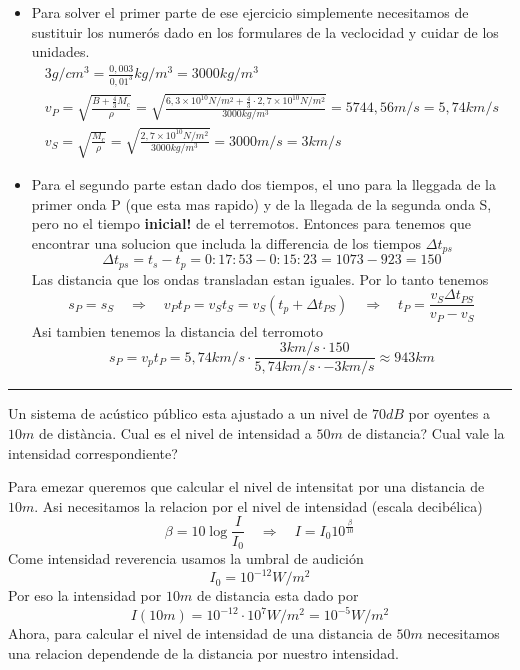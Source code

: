 \begin{itemize}
	\item
	Para solver el primer parte de ese ejercicio simplemente necesitamos de
	sustituir los numerós dado en los formulares de la veclocidad y cuidar de los
	unidades. 
	\begin{align*}
		3 g/cm^3 = \frac{0,003}{0,01^3} kg/m^3 = 3000 kg / m^3 \\
		v_P = \sqrt{\frac{B + \frac{4}{3} M_c}{\rho}} = \sqrt{\frac{6,3\times10^10
	N/m^2 + \frac{4}{3} \cdot 2,7 \times 10^10 N/m^2}{3000 kg/m^3}} = 5744,56 m/s  =
	5,74 km/s \\
		v_S = \sqrt{\frac{M_c}{\rho}} = \sqrt{\frac{2,7\times10^10 N/m^2}{3000
	kg/m^3}} = 3000 m/s = 3 km/s 
	\end{align*}

	\item
	Para el segundo parte estan dado dos tiempos, el uno para la lleggada de la
primer onda P (que esta mas rapido) y de la llegada de la segunda onda S, pero
no el tiempo \textbf{inicial!} de el terremotos. Entonces para tenemos que
encontrar una solucion que includa la differencia de los tiempos $\Delta t_{ps}$
	$$
		\Delta t_{ps} = t_s - t_p = 0:17:53 - 0:15:23 = 1073 - 923 = 150
	$$
	Las distancia que los ondas transladan estan iguales. Por lo tanto tenemos 
	$$
		s_P = s_S \quad \Rightarrow \quad v_P t_P = v_S t_S = v_S (t_p + \Delta
t_{PS}) \quad \Rightarrow \quad t_P = \frac{v_S \Delta t_{PS}}{v_P - v_S}
	$$
	Asi tambien tenemos la distancia del terromoto
	$$	
		s_P = v_p t_P = 5,74 km/s \cdot \frac{3 km/s \cdot 150}{5,74 km/s \cdot
- 3 km/s} \approx 943 km
	$$
\end{itemize}
\rule{\textwidth}{1px}
\begin{ejercicio}
	Un sistema de acústico público esta ajustado a un nivel de $70 dB$ por
oyentes a $10 m$ de distància. Cual es el nivel de intensidad a $50 m$ de
distancia? Cual vale la intensidad correspondiente?
\end{ejercicio}
Para emezar queremos que calcular el nivel de intensitat por una distancia de
$10m$. Asi necesitamos la relacion por el nivel de intensidad (escala
decibélica)
$$
	\beta = 10 \log \frac{I}{I_0} \quad \Rightarrow \quad I = I_0
10^{\frac{\beta}{10}}
$$
Come intensidad reverencia usamos la umbral de audición
$$
	I_0 = 10^{-12} W/m^2
$$
Por eso la intensidad por $10m$ de distancia esta dado por
$$
	I(10m) = 10^{-12} \cdot 10^7 W/m^2 = 10^{-5} W/m^2
$$
Ahora, para calcular el nivel de intensidad de una distancia de $50m $
necesitamos una relacion dependende de la distancia por nuestro intensidad.
